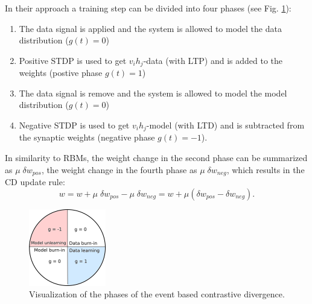 In their approach a training step can be divided into four phases (see Fig. \ref{fig:ecdph}):
\begin{enumerate}
\item The data signal is applied and the system is allowed to model the data distribution ($g(t)=0$)
\item Positive STDP is used to get $v_i h_j$-data (with LTP) and is added to the weights (postive phase $g(t)=1$)
\item The data signal is remove and the system is allowed to model the model distribution ($g(t)=0$)
\item Negative STDP is used to get $v_i h_j$-model (with LTD) and is subtracted from the synaptic weights (negative phase $g(t)=-1$).
\end{enumerate}


In similarity to RBMs, the weight change in the second phase can be summarized as $\mu \; \delta w_{pos}$, the weight change in the fourth phase as $\mu \; \delta w_{neg}$, which results in the CD update rule:
\[
w = w +  \mu \; \delta w_{pos} - \mu \; \delta w_{neg} = w +  \mu (\delta w_{pos} - \delta w_{neg}).
\]
 
 

\begin{figure}[h!]
	\centering
    	\includegraphics[width=0.3\textwidth]{imgs/eCD11.png} 
    \caption{Visualization of the phases of the event based contrastive divergence.}
	\label{fig:ecdph}
\end{figure}